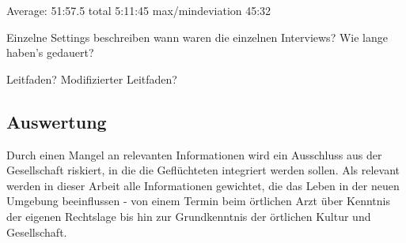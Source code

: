 Average:			51:57.5
total				5:11:45
max/mindeviation	45:32

Einzelne Settings beschreiben
wann waren die einzelnen Interviews?
Wie lange haben's gedauert?

Leitfaden?
Modifizierter Leitfaden?

\subsection{Auswertung}


Durch einen Mangel an relevanten Informationen wird ein Ausschluss aus der Gesellschaft riskiert, in die die Gefl\"uchteten integriert werden sollen. \cite{andrade2016information}\newline
Als relevant werden in dieser Arbeit alle Informationen gewichtet, die das Leben in der neuen Umgebung beeinflussen - von einem Termin beim \"ortlichen Arzt \"uber Kenntnis der eigenen Rechtslage bis hin zur Grundkenntnis der \"ortlichen Kultur und Gesellschaft. \cite{schreieck2017supporting}\newline


